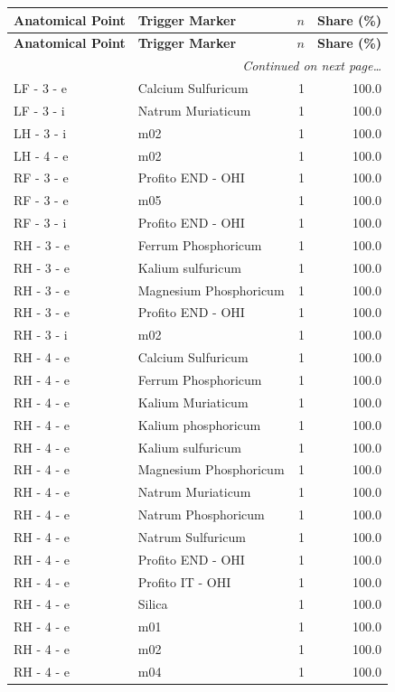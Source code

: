 \documentclass[a4paper,11pt]{article}
\begin{document}
\begin{footnotesize}
\begin{longtable}{p{3.5cm}p{7.5cm}rr}
\toprule
\textbf{Anatomical Point} &
\textbf{Trigger Marker} &
\textbf{$n$} &
\textbf{Share (\%)} \\
\midrule
\endfirsthead
\toprule
\textbf{Anatomical Point} &
\textbf{Trigger Marker} &
\textbf{$n$} &
\textbf{Share (\%)} \\
\midrule
\endhead
\midrule
\multicolumn{4}{r}{\footnotesize\emph{Continued on next page\ldots}} \\
\endfoot
\bottomrule
\endlastfoot
LF - 3 - e & Calcium Sulfuricum & 1 & 100.0 \\
LF - 3 - i & Natrum Muriaticum & 1 & 100.0 \\
LH - 3 - i & m02 & 1 & 100.0 \\
LH - 4 - e & m02 & 1 & 100.0 \\
RF - 3 - e & Profito END - OHI & 1 & 100.0 \\
RF - 3 - e & m05 & 1 & 100.0 \\
RF - 3 - i & Profito END - OHI & 1 & 100.0 \\
RH - 3 - e & Ferrum Phosphoricum & 1 & 100.0 \\
RH - 3 - e & Kalium sulfuricum & 1 & 100.0 \\
RH - 3 - e & Magnesium Phosphoricum & 1 & 100.0 \\
RH - 3 - e & Profito END - OHI & 1 & 100.0 \\
RH - 3 - i & m02 & 1 & 100.0 \\
RH - 4 - e & Calcium Sulfuricum & 1 & 100.0 \\
RH - 4 - e & Ferrum Phosphoricum & 1 & 100.0 \\
RH - 4 - e & Kalium Muriaticum & 1 & 100.0 \\
RH - 4 - e & Kalium phosphoricum & 1 & 100.0 \\
RH - 4 - e & Kalium sulfuricum & 1 & 100.0 \\
RH - 4 - e & Magnesium Phosphoricum & 1 & 100.0 \\
RH - 4 - e & Natrum Muriaticum & 1 & 100.0 \\
RH - 4 - e & Natrum Phosphoricum & 1 & 100.0 \\
RH - 4 - e & Natrum Sulfuricum & 1 & 100.0 \\
RH - 4 - e & Profito END - OHI & 1 & 100.0 \\
RH - 4 - e & Profito IT - OHI & 1 & 100.0 \\
RH - 4 - e & Silica & 1 & 100.0 \\
RH - 4 - e & m01 & 1 & 100.0 \\
RH - 4 - e & m02 & 1 & 100.0 \\
RH - 4 - e & m04 & 1 & 100.0 \\
\end{longtable}
\end{footnotesize}
\end{document}
